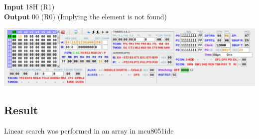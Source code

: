 \textbf{Input} 18H (R1)\\
\textbf{Output} 00 (R0) (Implying the element is not found)\\
\begin{center}
	\includegraphics[width=\textwidth]{img/p26/ss3.png}
\end{center}

\subsection{Result}
Linear search was performed in an array in mcu8051ide
